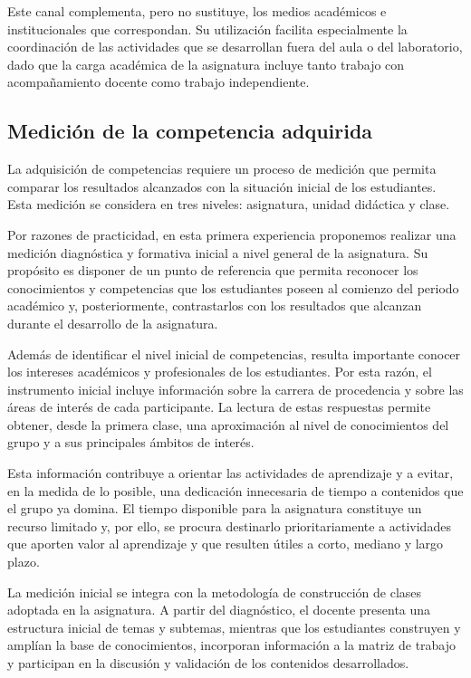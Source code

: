 \documentclass[12pt,a4paper]{article}
\begin{document}
Este canal complementa, pero no sustituye, los medios académicos e institucionales que correspondan. Su utilización facilita especialmente la coordinación de las actividades que se desarrollan fuera del aula o del laboratorio, dado que la carga académica de la asignatura incluye tanto trabajo con acompañamiento docente como trabajo independiente.

\subsection{Medición de la competencia adquirida}

La adquisición de competencias requiere un proceso de medición que permita comparar los resultados alcanzados con la situación inicial de los estudiantes. Esta medición se considera en tres niveles: asignatura, unidad didáctica y clase.

Por razones de practicidad, en esta primera experiencia proponemos realizar una medición diagnóstica y formativa inicial a nivel general de la asignatura. Su propósito es disponer de un punto de referencia que permita reconocer los conocimientos y competencias que los estudiantes poseen al comienzo del periodo académico y, posteriormente, contrastarlos con los resultados que alcanzan durante el desarrollo de la asignatura.\parencite{armoa2026planeamiento}

Además de identificar el nivel inicial de competencias, resulta importante conocer los intereses académicos y profesionales de los estudiantes. Por esta razón, el instrumento inicial incluye información sobre la carrera de procedencia y sobre las áreas de interés de cada participante. La lectura de estas respuestas permite obtener, desde la primera clase, una aproximación al nivel de conocimientos del grupo y a sus principales ámbitos de interés.

Esta información contribuye a orientar las actividades de aprendizaje y a evitar, en la medida de lo posible, una dedicación innecesaria de tiempo a contenidos que el grupo ya domina. El tiempo disponible para la asignatura constituye un recurso limitado y, por ello, se procura destinarlo prioritariamente a actividades que aporten valor al aprendizaje y que resulten útiles a corto, mediano y largo plazo.

La medición inicial se integra con la metodología de construcción de clases adoptada en la asignatura. A partir del diagnóstico, el docente presenta una estructura inicial de temas y subtemas, mientras que los estudiantes construyen y amplían la base de conocimientos, incorporan información a la matriz de trabajo y participan en la discusión y validación de los contenidos desarrollados.
\end{document}
